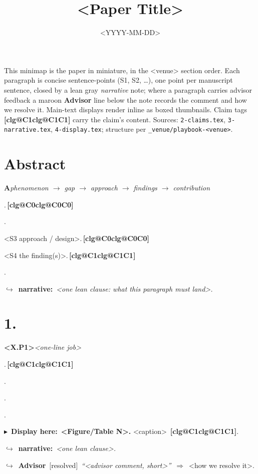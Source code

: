 \documentclass[11pt]{article}
\title{<Paper Title>}        %
\date{<YYYY-MM-DD>}
\makeatletter
\newcommand{\cl@gloss}[1]{\ifcsname clg@#1\endcsname\csname clg@#1\endcsname\else #1\fi}
\newcommand{\cl}[1]{\,\textcolor{cClaim}{\footnotesize\textbf{[\cl@gloss{#1}]}}}
\newcommand{\dcall}[1]{\par\smallskip\noindent\colorbox{gray!18}{\parbox{0.96\linewidth}{%
  \footnotesize $\blacktriangleright$~\textbf{Display here:}~#1}}\par\smallskip}
\newcommand{\pspine}[2]{\medskip\noindent\textbf{#1}\;\textbar\;\textit{#2}\par\nopagebreak}
\newcommand{\nnote}[1]{\par\nopagebreak\smallskip\noindent\hspace*{2.4em}%
  \parbox{\dimexpr\linewidth-2.6em\relax}{\footnotesize\color{cNote}$\hookrightarrow$~\textbf{narrative:}~\textit{#1}}\par\smallskip}
\newcommand{\pfb}[3]{\par\nopagebreak\noindent\hspace*{2.4em}%
  \parbox{\dimexpr\linewidth-2.6em\relax}{\footnotesize\color{cFb}$\hookrightarrow$~\textbf{Advisor}~[#1]~\emph{``#2''}~$\Rightarrow$~#3}\par\smallskip}
\makeatother
\begin{document}
\maketitle

\noindent\footnotesize This minimap is the paper in miniature, in the <venue>
section order. Each paragraph is concise sentence-points (S1, S2, \dots), one
point per manuscript sentence, closed by a lean gray \emph{narrative} note; where
a paragraph carries advisor feedback a maroon \textbf{Advisor} line below the note
records the comment and how we resolve it. Main-text displays render inline as
boxed thumbnails. Claim tags \cl{C1} carry the claim's content. Sources:
\texttt{2-claims.tex}, \texttt{3-narrative.tex}, \texttt{4-display.tex}; structure
per \texttt{\_venue/playbook-<venue>}.\normalsize

\medskip
\noindent{}

\hrulefill

\section*{Abstract}
\pspine{A}{phenomenon $\rightarrow$ gap $\rightarrow$ approach $\rightarrow$ findings $\rightarrow$ contribution}
\begin{spts}
\item <S1 phenomenon>.\cl{C0}
\item <S2 gap>.
\item <S3 approach / design>.\cl{C0}
\item <S4 the finding(s)>.\cl{C1}
\item <S5 the contribution>.
\end{spts}
\nnote{<one lean clause: what this paragraph must land>.}

\hrulefill

\section*{1.}
\pspine{<X.P1>}{<one-line job>}
\begin{spts}
\item <S1>.\cl{C1}
\item <S2>.
\item <S3>.
\item <S4>.
\end{spts}
\dcall{\textbf{<Figure/Table N>.} <caption> \cl{C1}.}

\nnote{<one lean clause>.}
\pfb{resolved}{<advisor comment, short>}{<how we resolve it>.}
\end{document}
